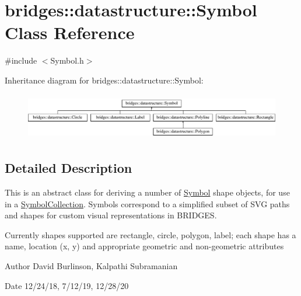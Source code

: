 \hypertarget{classbridges_1_1datastructure_1_1_symbol}{}\section{bridges\+:\+:datastructure\+:\+:Symbol Class Reference}
\label{classbridges_1_1datastructure_1_1_symbol}


{\ttfamily \#include $<$Symbol.\+h$>$}

Inheritance diagram for bridges\+:\+:datastructure\+:\+:Symbol\+:\begin{figure}[H]
\begin{center}
\leavevmode
\includegraphics[height=2.058824cm]{classbridges_1_1datastructure_1_1_symbol}
\end{center}
\end{figure}


\subsection{Detailed Description}
This is an abstract class for deriving a number of \hyperlink{classbridges_1_1datastructure_1_1_symbol}{Symbol} shape objects, for use in a \hyperlink{classbridges_1_1datastructure_1_1_symbol_collection}{Symbol\+Collection}. Symbols correspond to a simplified subset of S\+VG paths and shapes for custom visual representations in B\+R\+I\+D\+G\+ES. 

Currently shapes supported are rectangle, circle, polygon, label; each shape has a name, location (x, y) and appropriate geometric and non-\/geometric attributes

\begin{DoxyAuthor}{Author}
David Burlinson, Kalpathi Subramanian 
\end{DoxyAuthor}
\begin{DoxyDate}{Date}
12/24/18, 7/12/19, 12/28/20 
\end{DoxyDate}

